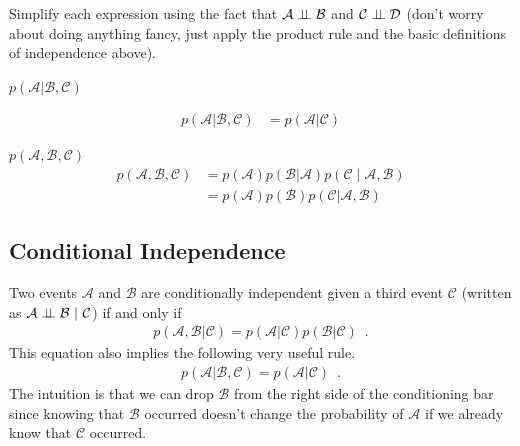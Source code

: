 \documentclass{tufte-handout}
\begin{document}
\begin{exercise}
Simplify each expression using the fact that $\mathcal{A} \perp\!\!\!\perp \mathcal{B}$ and $\mathcal{C} \perp\!\!\!\perp \mathcal{D}$ (don't worry about doing anything fancy, just apply the product rule and the basic definitions of independence above).
\bes
\item $p(\mathcal{A} | \mathcal{B}, \mathcal{C})$
\begin{boxedsolution}
\begin{align}
p(\mathcal{A} | \mathcal{B}, \mathcal{C}) &= p(\mathcal{A} | \mathcal{C})
\end{align}
\end{boxedsolution}
\item $p(\mathcal{A}, \mathcal{B}, \mathcal{C})$
\begin{align}
p(\mathcal{A}, \mathcal{B}, \mathcal{C}) &= p(\mathcal{A}) p(\mathcal{B}| \mathcal{A}) p(\mathcal{C} \mid \mathcal{A}, \mathcal{B}) \nonumber \\
&= p(\mathcal{A}) p(\mathcal{B}) p(\mathcal{C} | \mathcal{A}, \mathcal{B}) \nonumber
\end{align}
\ees
\end{exercise}

\subsection{Conditional Independence}


Two events $\mathcal{A}$ and $\mathcal{B}$ are conditionally independent given a third event $\mathcal{C}$ (written as $\mathcal{A} \perp\!\!\!\perp \mathcal{B}~|~\mathcal{C}$) if and only if
\begin{align}
p(\mathcal{A}, \mathcal{B} | \mathcal{C}) = p(\mathcal{A} | \mathcal{C}) p(\mathcal{B} | \mathcal{C}) \enspace .
\end{align}
This equation also implies the following very useful rule.
\begin{align}
p(\mathcal{A} | \mathcal{B}, \mathcal{C}) = p(\mathcal{A} | \mathcal{C}) \enspace .
\end{align}
The intuition is that we can drop $\mathcal{B}$ from the right side of the conditioning bar since knowing that $\mathcal{B}$ occurred doesn't change the probability of $\mathcal{A}$ if we already know that $\mathcal{C}$ occurred.
\end{document}
